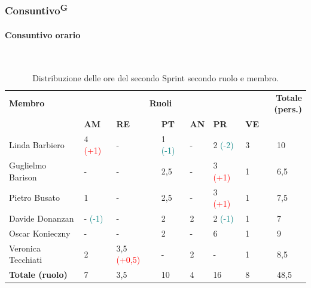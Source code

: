 \documentclass[8pt]{article}
\newcommand{\glossterm}[1]{#1\textsuperscript{G}} %
\newcommand{\subsubsubsection}[1]{\paragraph{#1}\mbox{}\\}
\begin{document}
\subsubsection{\glossterm{Consuntivo}}
\subsubsubsection{Consuntivo orario}
\begin{table}[ht!]
	\centering
	\begin{tabular}{p{3cm} p{1.4cm} p{1.6cm} p{1.5cm} p{1.5cm} p{1.5cm} p{1.5cm} p{1cm}}
		\toprule
        \textbf{Membro} & \multicolumn{5}{c}{\textbf{Ruoli}} & \multicolumn{2}{r}{\textbf{Totale (pers.)}}\\
		& \textbf{AM} & \textbf{RE} & \textbf{PT} & \textbf{AN} & \textbf{PR} & \textbf{VE}\\
		\midrule
        Linda Barbiero          & 4 \textcolor{red}{(+1)} & - & 1 \textcolor{teal}{(-1)}  & - & 2
        \textcolor{teal}{(-2)} & 3 & 10 \\
        Guglielmo Barison       & - & - & 2,5 & -     & 3 \textcolor{red}{(+1)}  & 1     & 6,5\\
        Pietro Busato           & 1     & -     & 2,5     & -     & 3 \textcolor{red}{(+1)}  & 1     & 7,5 \\
        Davide Donanzan         & - \textcolor{teal}{(-1)}    & -     & 2     & 2     & 2
        \textcolor{teal}{(-1)}     & 1     & 7 \\
        Oscar Konieczny         & -   & -     & 2     & -     & 6     & 1     & 9 \\
        Veronica Tecchiati      & 2   & 3,5 \textcolor{red}{(+0,5)}     & -     & 2     & -     & 1     & 8,5 \\
        \bottomrule
        \textbf{Totale (ruolo)} & 7    & 3,5     & 10     & 4   & 16     & 8   & 48,5 \\
	\end{tabular}
	\caption{Distribuzione delle ore del secondo Sprint secondo ruolo e membro.}
	\label{table:Distribuzione delle ore consuntive del secondo Sprint secondo ruolo e membro}
\end{table}
\end{document}

